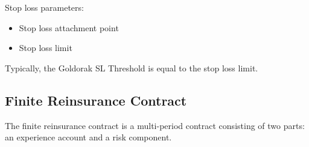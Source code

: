 Stop loss parameters:
\begin{itemize}
\item Stop loss attachment point
\item Stop loss limit
\end{itemize}

Typically, the Goldorak SL Threshold is equal to the stop loss limit.


\subsection{Finite Reinsurance Contract}
\label{sec:FiniteReinsuranceContract}

The finite reinsurance contract is a multi-period contract consisting of two parts: an experience account and a risk component.

